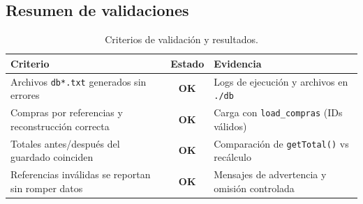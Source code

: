 \documentclass[11pt]{article}
\begin{document}
\subsection{Resumen de validaciones}
\begin{table}[H]\centering
\begin{tabular}{p{8cm} c p{6cm}}
\toprule
\textbf{Criterio} & \textbf{Estado} & \textbf{Evidencia} \\
\midrule
Archivos \texttt{db*.txt} generados sin errores &
\textbf{OK} &
Logs de ejecución y archivos en \texttt{./db} \\
Compras por referencias y reconstrucción correcta &
\textbf{OK} &
Carga con \texttt{load\_compras} (IDs válidos) \\
Totales antes/después del guardado coinciden &
\textbf{OK} &
Comparación de \texttt{getTotal()} vs recálculo \\
Referencias inválidas se reportan sin romper datos &
\textbf{OK} &
Mensajes de advertencia y omisión controlada \\
\bottomrule
\end{tabular}
\caption{Criterios de validación y resultados.}
\end{table}



\end{document}
